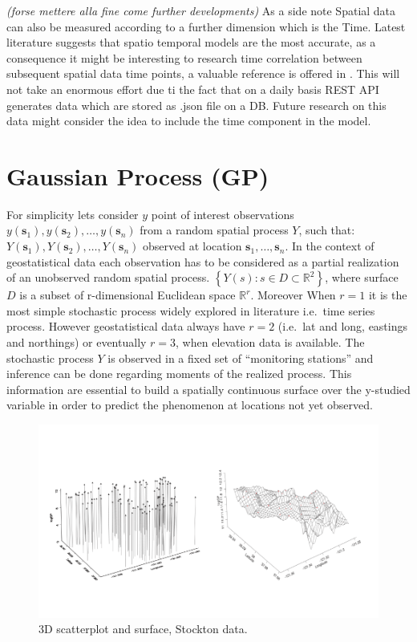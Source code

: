 \documentclass[
  12pt,
  a4paper,
  oneside]{book}
\begin{document}
\emph{(forse mettere alla fine come further developments)}
As a side note Spatial data can also be measured according to a further dimension which is the Time. Latest literature suggests that spatio temporal models are the most accurate, as a consequence it might be interesting to research time correlation between subsequent spatial data time points, a valuable reference is offered in \citet{PACI2017149}. This will not take an enormous effort due ti the fact that on a daily basis REST API generates data which are stored as .json file on a DB. Future research on this data might consider the idea to include the time component in the model.

\hypertarget{GP}{%
\section{Gaussian Process (GP)}\label{GP}}

For simplicity lets consider \(y\) point of interest observations \(y\left(\boldsymbol{s}_{1}\right),y\left(\boldsymbol{s}_{2}\right), \ldots, y\left(\boldsymbol{s}_{n}\right)\)
from a random spatial process \(Y\), such that: \(Y\left(\boldsymbol{s}_{1}\right),Y\left(\boldsymbol{s}_{2}\right), \ldots, Y\left(\boldsymbol{s}_{n}\right)\) observed at location \(\boldsymbol{s}_{1}, \ldots, \boldsymbol{s}_{n}\). In the context of geostatistical data each observation has to be considered as a partial realization of an unobserved random spatial process.
\(\left\{Y(s): s \in D \subset \mathbb{R}^{2}\right\}\), where surface \(D\) is a subset of r-dimensional Euclidean space \(\mathbb{R}^{r}\).
Moreover When \(r = 1\) it is the most simple stochastic process widely explored in literature i.e.~time series process. However geostatistical data always have \(r = 2\) (i.e.~lat and long, eastings and northings) or eventually \(r = 3\), when elevation data is available. The stochastic process \(Y\) is observed in a fixed set of ``monitoring stations'' and inference can be done regarding moments of the realized process. This information are essential to build a spatially continuous surface over the y-studied variable in order to predict the phenomenon at locations not yet observed.

\begin{figure}
\centering
\includegraphics{images/prdprocess.png}
\caption{3D scatterplot and surface, Stockton data.}
\end{figure}
\end{document}
